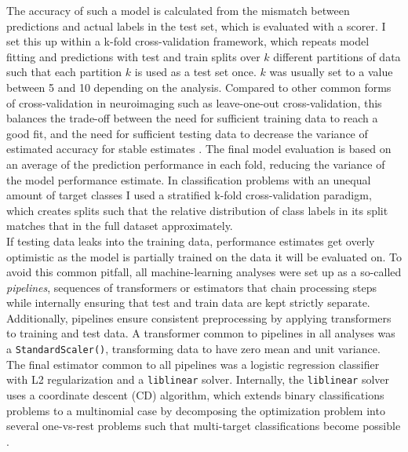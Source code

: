 The accuracy of such a model is calculated from the mismatch between predictions and actual labels in the test set, which is evaluated with a scorer.
I set this up within a k-fold cross-validation framework, which repeats model fitting and predictions with test and train splits over $k$ different partitions of data such that each partition $k$ is used as a test set once.
$k$ was usually set to a value between 5 and 10 depending on the analysis.
Compared to other common forms of cross-validation in neuroimaging such as leave-one-out cross-validation, this balances the trade-off between the need for sufficient training data to reach a good fit, and the need for sufficient testing data to decrease the variance of estimated accuracy for stable estimates \citep{VAROQUAUX2017166}.
The final model evaluation is based on an average of the prediction performance in each fold, reducing the variance of the model performance estimate.
In classification problems with an unequal amount of target classes I used a stratified k-fold cross-validation paradigm, which creates splits such that the relative distribution of class labels in its split matches that in the full dataset approximately.\\
If testing data leaks into the training data, performance estimates get overly optimistic as the model is partially trained on the data it will be evaluated on.
To avoid this common pitfall, all machine-learning analyses were set up as a so-called \textit{pipelines}, sequences of transformers or estimators that chain processing steps while internally ensuring that test and train data are kept strictly separate.
Additionally, pipelines ensure consistent preprocessing by applying transformers to training and test data.
A transformer common to pipelines in all analyses was a \texttt{StandardScaler()}, transforming data to have zero mean and unit variance.
The final estimator common to all pipelines was a logistic regression classifier with L2 regularization and a \texttt{liblinear} solver.
Internally, the \texttt{liblinear} solver uses a coordinate descent (CD) algorithm, which extends binary classifications problems to a multinomial case by decomposing the optimization problem into several one-vs-rest problems such that multi-target classifications become possible \citep{scikit-learn-liblinear}.\\



